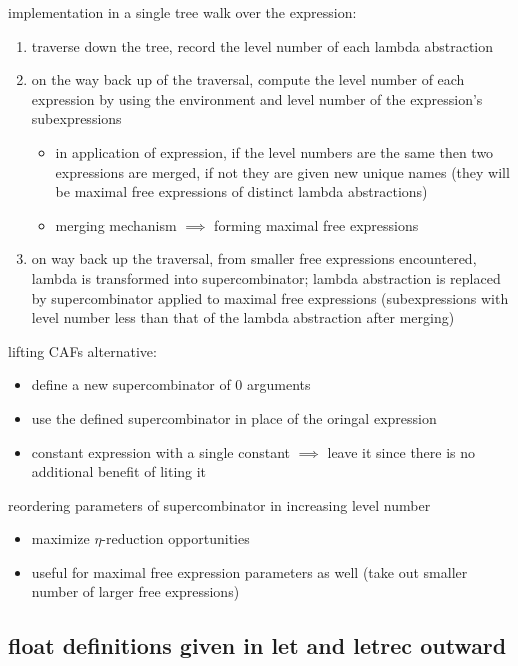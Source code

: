 \documentclass[8pt]{extarticle}
\begin{document}
\begin{multicols*}{2}
implementation in a single tree walk over the expression:
\begin{enumerate}
\item traverse down the tree, record the level number of each lambda abstraction
\item on the way back up of the traversal, compute the level number of each expression by using the environment and level number of the expression's subexpressions
  \begin{itemize}
  \item in application of expression, if the level numbers are the same then two expressions are merged, if not they are given new unique names (they will be maximal free expressions of distinct lambda abstractions)
  \item merging mechanism $\implies$ forming maximal free expressions
  \end{itemize}
\item on way back up the traversal, from smaller free expressions encountered, lambda is transformed into supercombinator; lambda abstraction is replaced by supercombinator applied to maximal free expressions (subexpressions with level number less than that of the lambda abstraction after merging)
\end{enumerate}

lifting CAFs alternative:
\begin{itemize}
\item define a new supercombinator of 0 arguments
\item use the defined supercombinator in place of the oringal expression
\item constant expression with a single constant $\implies$ leave it since there is no additional benefit of liting it
\end{itemize}

reordering parameters of supercombinator in increasing level number
\begin{itemize}
\item maximize $\eta$-reduction opportunities
\item useful for maximal free expression parameters as well (take out smaller number of larger free expressions)
\end{itemize}

\subsection{float definitions given in let and letrec outward}


\end{multicols*}
\end{document}
